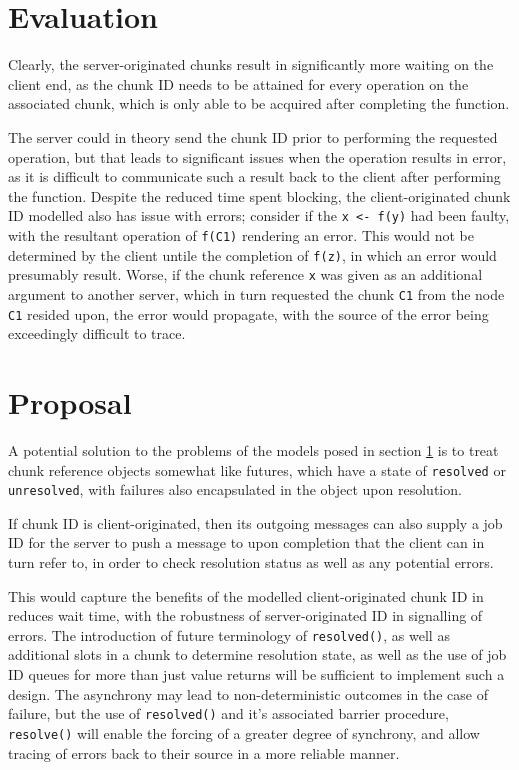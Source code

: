 \documentclass[a4paper,10pt]{article}
\begin{document}
\section{Evaluation}\label{sec:mod-eval}

Clearly, the server-originated chunks result in significantly more waiting on
the client end, as the chunk ID needs to be attained for every operation on the
associated chunk, which is only able to be acquired after completing the
function.

The server could in theory send the chunk ID prior to performing the requested
operation, but that leads to significant issues when the operation results in
error, as it is difficult to communicate such a result back to the client after
performing the function.
Despite the reduced time spent blocking, the client-originated chunk ID
modelled also has issue with errors; consider if the \texttt{x <- f(y)} had
been faulty, with the resultant operation of \texttt{f(C1)} rendering an error.
This would not be determined by the client untile the completion of
\texttt{f(z)}, in which an error would presumably result.
Worse, if the chunk reference \texttt{x} was given as an additional argument to
another server, which in turn requested the chunk \texttt{C1} from the node
\texttt{C1} resided upon, the error would propagate, with the source of the
error being exceedingly difficult to trace.

\section{Proposal}

A potential solution to the problems of the models posed in section
\ref{sec:mod-eval} is to treat chunk reference objects somewhat like futures,
which have a state of \texttt{resolved} or \texttt{unresolved}, with failures
also encapsulated in the object upon resolution\cite{bengtsson19:_futur_r}.

If chunk ID is client-originated, then its outgoing messages can also supply a
job ID for the server to push a message to upon completion that the client can
in turn refer to, in order to check resolution status as well as any potential
errors.

This would capture the benefits of the modelled client-originated chunk ID in
reduces wait time, with the robustness of server-originated ID in signalling of
errors.
The introduction of future terminology of \texttt{resolved()}, as well as
additional slots in a chunk to determine resolution state, as well as the use
of job ID queues for more than just value returns will be sufficient to
implement such a design.
The asynchrony may lead to non-deterministic outcomes in the case of failure,
but the use of \texttt{resolved()} and it's associated barrier procedure,
\texttt{resolve()} will enable the forcing of a greater degree of synchrony,
and allow tracing of errors back to their source in a more reliable manner.
\end{document}
